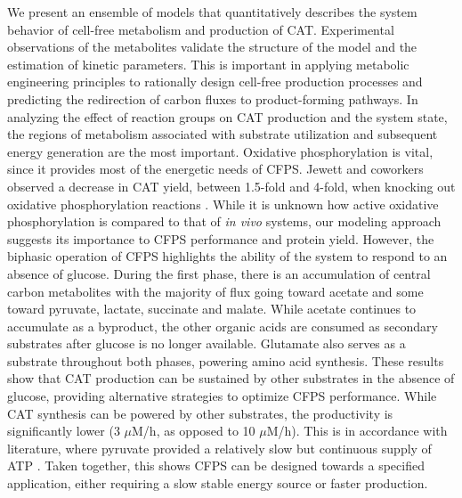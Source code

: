 \documentclass[12pt]{article}
\begin{document}
We present an ensemble of models that quantitatively describes the system behavior of cell-free metabolism and production of CAT.
Experimental observations of the metabolites validate the structure of the model and the estimation of kinetic parameters.
This is important in applying metabolic engineering principles to rationally design cell-free production processes and predicting the redirection of carbon fluxes to product-forming pathways.
In analyzing the effect of reaction groups on CAT production and the system state, the regions of metabolism associated with substrate utilization and subsequent energy generation are the most important.
Oxidative phosphorylation is vital, since it provides most of the energetic needs of CFPS.
Jewett and coworkers observed a decrease in CAT yield, between 1.5-fold and 4-fold, when knocking out oxidative phosphorylation reactions \cite{Jewett:2008aa}.
While it is unknown how active oxidative phosphorylation is compared to that of \textit{in vivo} systems, our modeling approach suggests its importance to CFPS performance and protein yield.
However, the biphasic operation of CFPS highlights the ability of the system to respond to an absence of glucose.
During the first phase, there is an accumulation of central carbon metabolites with the majority of flux going toward acetate and some toward pyruvate, lactate, succinate and malate.
While acetate continues to accumulate as a byproduct, the other organic acids are consumed as secondary substrates after glucose is no longer available.
Glutamate also serves as a substrate throughout both phases, powering amino acid synthesis.
These results show that CAT production can be sustained by other substrates in the absence of glucose, providing alternative strategies to optimize CFPS performance.
While CAT synthesis can be powered by other substrates, the productivity is significantly lower (3 $\mu$M/h, as opposed to 10 $\mu$M/h).
This is in accordance with literature, where pyruvate provided a relatively slow but continuous supply of ATP \cite{swartz_nature2001}.
Taken together, this shows CFPS can be designed towards a specified application, either requiring a slow stable energy source or faster production.
\end{document}
